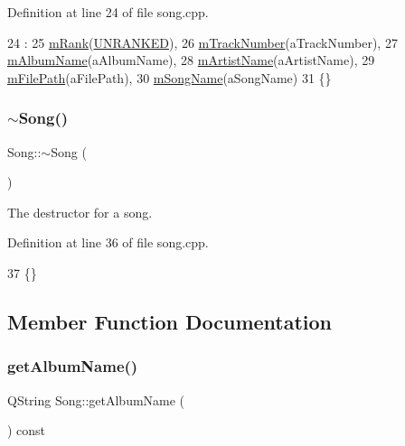 Definition at line 24 of file song.\+cpp.


\begin{DoxyCode}
24                                                                                                            
                             :
25     \mbox{\hyperlink{class_song_a18b47d2545fc5e7795cad143092c97e7}{mRank}}(\mbox{\hyperlink{song_8h_a2909ea516dd5d86c56e6a2e8035fed92}{UNRANKED}}),
26     \mbox{\hyperlink{class_song_a45f2f019180a08117bc1992f16fdb5f7}{mTrackNumber}}(aTrackNumber),
27     \mbox{\hyperlink{class_song_aadf3ea14887a9c5a36a1fe419d7d6222}{mAlbumName}}(aAlbumName),
28     \mbox{\hyperlink{class_song_a53eb13c6325e01434ee370ba2d9af292}{mArtistName}}(aArtistName),
29     \mbox{\hyperlink{class_song_af6852312a9369340908b7726d97979a6}{mFilePath}}(aFilePath),
30     \mbox{\hyperlink{class_song_af7fae22fdde85f62397c5a3618e8e573}{mSongName}}(aSongName)
31 \{\}
\end{DoxyCode}
\mbox{\label{class_song_a0749c3367e8de89e27458c248377027b}} 
\subsubsection{\texorpdfstring{$\sim$\+Song()}{~Song()}}
{\footnotesize\ttfamily Song\+::$\sim$\+Song (\begin{DoxyParamCaption}{ }\end{DoxyParamCaption})}



The destructor for a song. 



Definition at line 36 of file song.\+cpp.


\begin{DoxyCode}
37 \{\}
\end{DoxyCode}


\subsection{Member Function Documentation}
\mbox{\label{class_song_a34913925a88e1ca698aa33af96378d2f}} 
\subsubsection{\texorpdfstring{get\+Album\+Name()}{getAlbumName()}}
{\footnotesize\ttfamily Q\+String Song\+::get\+Album\+Name (\begin{DoxyParamCaption}{ }\end{DoxyParamCaption}) const}



